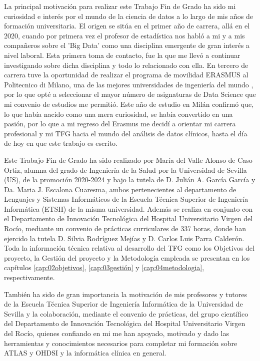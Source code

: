 La principal motivación para realizar este Trabajo Fin de Grado ha sido mi curiosidad e interés por el mundo de la ciencia de datos a lo largo de mis años de formación universitaria. El origen se sitúa en el primer año de carrera, allá en el 2020, cuando por primera vez el profesor de estadística nos habló a mi y a mis compañeros sobre el 'Big Data' como una disciplina emergente de gran interés a nivel laboral. Esta primera toma de contacto, fue la que me llevó a continuar investigando sobre dicha disciplina y todo lo relacionado con ella. En tercero de carrera tuve la oportunidad de realizar el programa de movilidad ERASMUS al Politecnico di Milano, una de las mejores universidades de ingeniería del mundo \cite{QSPolimi}, por lo que opté a seleccionar el mayor número de asignaturas de Data Science que mi convenio de estudios me permitió. Este año de estudio en Milán confirmó que, lo que había nacido como una mera curiosidad, se había convertido en una pasión, por lo que a mi regreso del Erasmus me decidí a orientar mi carrera profesional y mi TFG hacia el mundo del análisis de datos clínicos, hasta el día de hoy en que este trabajo es escrito.

Este Trabajo Fin de Grado ha sido realizado por María del Valle Alonso de Caso Ortiz, alumna del grado de Ingeniería de la Salud por la Universidad de Sevilla (US), de la promoción 2020-2024 y bajo la tutela de D. Julián A. García García y Da. Maria J. Escalona Cuaresma, ambos pertenecientes al departamento de Lenguajes y Sistemas Informáticos de la Escuela Técnica Superior de Ingeniería Informática (ETSII) de la misma universidad. Además se realiza en conjunto con el Departamento de Innovación Tecnológica del Hospital Universitario Virgen del Rocío, mediante un convenio de prácticas curriculares de 337 horas, donde han ejercido la tutela D. Silvia Rodríguez Mejías y D. Carlos Luis Parra Calderón. Toda la información técnica relativa al desarrollo del TFG como los Objetivos del proyecto, la Gestión del proyecto y la Metodología empleada se presentan en los capítulos \ref{cap:02objetivos}, \ref{cap:03gestión} y \ref{cap:04metodologia}, respectivamente.

También ha sido de gran importancia la motivación de mis profesores y tutores de la Escuela Técnica Superior de Ingeniería Informática de la Universidad de Sevilla y la colaboración, mediante el convenio de prácticas, del grupo científico del Departamento de Innovación Tecnológica del Hospital Universitario Virgen del Rocío, quienes confiando en mi me han apoyado, motivado y dado las herramientas y conocimientos necesarios para completar mi formación sobre ATLAS y OHDSI y la informática clínica en general.

